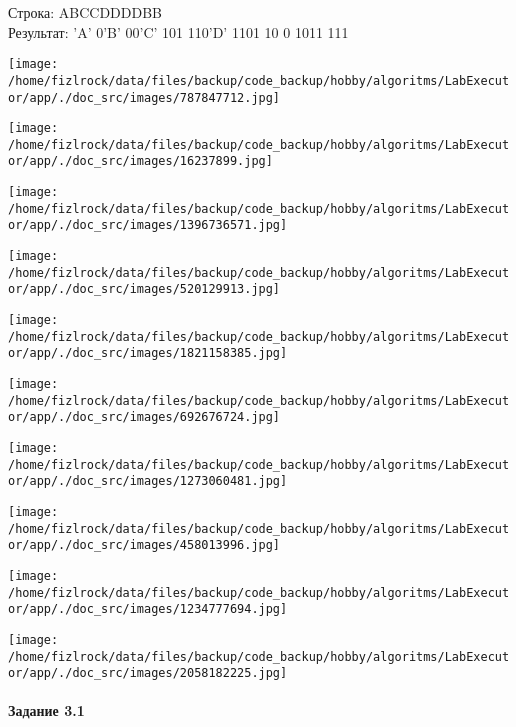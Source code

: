 \documentclass[a4paper, 12pt]{article}
\begin{document}
Строка: 
ABCCDDDDBB\\
Результат: 'A' 0'B' 00'C' 101 110'D' 1101 10 0 1011 111

\texttt{[image: /home/fizlrock/data/files/backup/code\_backup/hobby/algoritms/LabExecutor/app/./doc\_src/images/787847712.jpg]}

\texttt{[image: /home/fizlrock/data/files/backup/code\_backup/hobby/algoritms/LabExecutor/app/./doc\_src/images/16237899.jpg]}

\texttt{[image: /home/fizlrock/data/files/backup/code\_backup/hobby/algoritms/LabExecutor/app/./doc\_src/images/1396736571.jpg]}

\texttt{[image: /home/fizlrock/data/files/backup/code\_backup/hobby/algoritms/LabExecutor/app/./doc\_src/images/520129913.jpg]}

\texttt{[image: /home/fizlrock/data/files/backup/code\_backup/hobby/algoritms/LabExecutor/app/./doc\_src/images/1821158385.jpg]}

\texttt{[image: /home/fizlrock/data/files/backup/code\_backup/hobby/algoritms/LabExecutor/app/./doc\_src/images/692676724.jpg]}

\texttt{[image: /home/fizlrock/data/files/backup/code\_backup/hobby/algoritms/LabExecutor/app/./doc\_src/images/1273060481.jpg]}

\texttt{[image: /home/fizlrock/data/files/backup/code\_backup/hobby/algoritms/LabExecutor/app/./doc\_src/images/458013996.jpg]}

\texttt{[image: /home/fizlrock/data/files/backup/code\_backup/hobby/algoritms/LabExecutor/app/./doc\_src/images/1234777694.jpg]}

\texttt{[image: /home/fizlrock/data/files/backup/code\_backup/hobby/algoritms/LabExecutor/app/./doc\_src/images/2058182225.jpg]}
\pagebreak
\paragraph{Задание 3.1}
\end{document}
